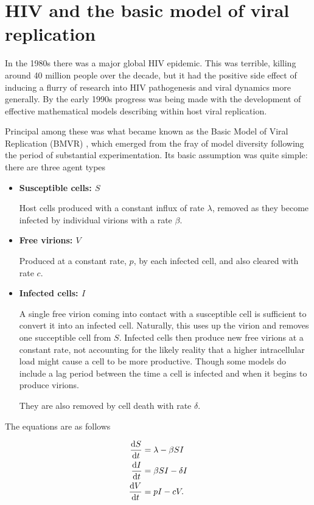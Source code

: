 \section{HIV and the basic model of viral replication}
In the 1980s there was a major global HIV epidemic. This was terrible, killing around 40 million people over the decade, but it had the positive side effect of inducing a flurry of research into HIV pathogenesis and viral dynamics more generally. By the early 1990s progress was being made with the development of effective mathematical models describing within host viral replication.\par
Principal among these was what became known as the Basic Model of Viral Replication (BMVR) \cite{mclean1993balance}, which emerged from the fray of model diversity following the period of substantial experimentation. Its basic assumption was quite simple: there are three agent types

\begin{itemize}
\item \textbf{Susceptible cells: $S$} 

Host cells produced with a constant influx of rate $\lambda$, removed as they become infected by individual virions with a rate $\beta$.

\item \textbf{Free virions: $V$}

Produced at a constant rate, $p$, by each infected cell, and also cleared with rate $c$.

\item \textbf{Infected cells: $I$}

A single free virion coming into contact with a susceptible cell is sufficient to convert it into an infected cell. Naturally, this uses up the virion and removes one succeptible cell from $S$. Infected cells then produce new free virions at a constant rate, not accounting for the likely reality that a higher intracellular load might cause a cell to be more productive. Though some models do include a lag period between the time a cell is infected and when it begins to produce virions.\par
They are also removed by cell death with rate $\delta$.
\end{itemize}

\noindent
The equations are as follows

\begin{align*}
\frac{\mathrm{d}S}{\mathrm{d}t} & = \lambda - \beta SI\\
\frac{\mathrm{d}I}{\mathrm{d}t} & = \beta SI - \delta I\\
\frac{\mathrm{d}V}{\mathrm{d}t}& = p I - c V.
\end{align*}

